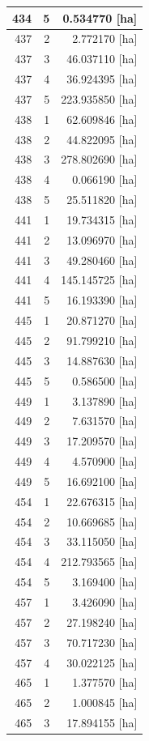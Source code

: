 \documentclass[11pt,]{book}
\begin{document}
\begin{table}
\begin{tabular}[t]{r|r|r}
\hline
434 & 5 & 0.534770 [ha]\\
\hline
437 & 2 & 2.772170 [ha]\\
\hline
437 & 3 & 46.037110 [ha]\\
\hline
437 & 4 & 36.924395 [ha]\\
\hline
437 & 5 & 223.935850 [ha]\\
\hline
438 & 1 & 62.609846 [ha]\\
\hline
438 & 2 & 44.822095 [ha]\\
\hline
438 & 3 & 278.802690 [ha]\\
\hline
438 & 4 & 0.066190 [ha]\\
\hline
438 & 5 & 25.511820 [ha]\\
\hline
441 & 1 & 19.734315 [ha]\\
\hline
441 & 2 & 13.096970 [ha]\\
\hline
441 & 3 & 49.280460 [ha]\\
\hline
441 & 4 & 145.145725 [ha]\\
\hline
441 & 5 & 16.193390 [ha]\\
\hline
445 & 1 & 20.871270 [ha]\\
\hline
445 & 2 & 91.799210 [ha]\\
\hline
445 & 3 & 14.887630 [ha]\\
\hline
445 & 5 & 0.586500 [ha]\\
\hline
449 & 1 & 3.137890 [ha]\\
\hline
449 & 2 & 7.631570 [ha]\\
\hline
449 & 3 & 17.209570 [ha]\\
\hline
449 & 4 & 4.570900 [ha]\\
\hline
449 & 5 & 16.692100 [ha]\\
\hline
454 & 1 & 22.676315 [ha]\\
\hline
454 & 2 & 10.669685 [ha]\\
\hline
454 & 3 & 33.115050 [ha]\\
\hline
454 & 4 & 212.793565 [ha]\\
\hline
454 & 5 & 3.169400 [ha]\\
\hline
457 & 1 & 3.426090 [ha]\\
\hline
457 & 2 & 27.198240 [ha]\\
\hline
457 & 3 & 70.717230 [ha]\\
\hline
457 & 4 & 30.022125 [ha]\\
\hline
465 & 1 & 1.377570 [ha]\\
\hline
465 & 2 & 1.000845 [ha]\\
\hline
465 & 3 & 17.894155 [ha]\\

\end{tabular}
\end{table}
\end{document}
